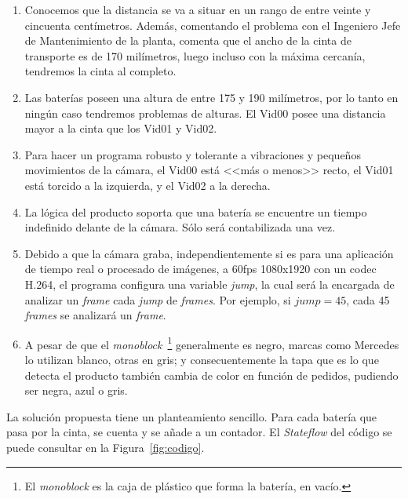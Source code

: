 \documentclass[11pt]{memoir}
\begin{document}
\begin{enumerate}
\item Conocemos que la distancia se va a situar en un rango de entre veinte y cincuenta centímetros. Además, comentando el problema con el Ingeniero Jefe de Mantenimiento de la planta, comenta que el ancho de la cinta de transporte es de 170 milímetros, luego incluso con la máxima cercanía, tendremos la cinta al completo.
\item Las baterías poseen una altura de entre 175 y 190 milímetros, por lo tanto en ningún caso tendremos problemas de alturas. El Vid00 posee una distancia mayor a la cinta que los Vid01 y Vid02.
\item Para hacer un programa robusto y tolerante a vibraciones y pequeños movimientos de la cámara, el Vid00 está <<más o menos>> recto, el Vid01 está torcido a la izquierda, y el Vid02 a la derecha.
\item La lógica del producto soporta que una batería se encuentre un tiempo indefinido delante de la cámara. Sólo será contabilizada una vez.
\item Debido a que la cámara graba, independientemente si es para una aplicación de tiempo real o procesado de imágenes, a 60fps 1080x1920 con un codec H.264, el programa configura una variable \textit{jump}, la cual será la encargada de analizar un \textit{frame} cada \textit{jump} de \textit{frames}. Por ejemplo, si $jump = 45$, cada 45 \textit{frames} se analizará un \textit{frame}.
\item A pesar de que el \textit{monoblock}~\footnote{El \textit{monoblock} es la caja de plástico que forma la batería, en vacío.} generalmente es negro, marcas como Mercedes lo utilizan blanco, otras en gris; y consecuentemente la tapa que es lo que detecta el producto también cambia de color en función de pedidos, pudiendo ser negra, azul o gris.
\end{enumerate}

La solución propuesta tiene un planteamiento sencillo. Para cada batería que pasa por la cinta, se cuenta y se añade a un contador. 
El \textit{Stateflow} del código se puede consultar en la Figura~\ref{fig:codigo}.
\end{document}
